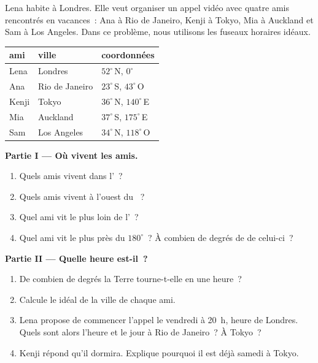 \begin{problem}
\label{pb:g6:latitude-longitude:1}
Lena habite à Londres. Elle veut organiser un appel vidéo avec quatre amis
rencontrés en vacances~: Ana à Rio de Janeiro, Kenji à Tokyo, Mia à
Auckland et Sam à Los Angeles. Dans ce problème, nous utilisons les fuseaux
horaires idéaux.

\begin{center}
\small
\begin{tabular}{lll}
\hline
ami & ville & coordonnées\\
\hline
Lena & Londres & $52^\circ$\,N, $0^\circ$\\
Ana & Rio de Janeiro & $23^\circ$\,S, $43^\circ$\,O\\
Kenji & Tokyo & $36^\circ$\,N, $140^\circ$\,E\\
Mia & Auckland & $37^\circ$\,S, $175^\circ$\,E\\
Sam & Los Angeles & $34^\circ$\,N, $118^\circ$\,O\\
\hline
\end{tabular}
\end{center}

\medskip
\noindent\textbf{Partie I --- Où vivent les amis.}
\begin{enumerate}
  \item Quels amis vivent dans l'~?
  \item Quels amis vivent à l'ouest du ~?
  \item Quel ami vit le plus loin de l'~?
  \item Quel ami vit le plus près du  $180^\circ$~? À combien de
        degrés de  de celui-ci~?
\end{enumerate}

\medskip
\noindent\textbf{Partie II --- Quelle heure est-il~?}
\begin{enumerate}[resume]
  \item De combien de degrés la Terre tourne-t-elle en une heure~?
  \item Calcule le  idéal de la ville de chaque ami.
  \item Lena propose de commencer l'appel le vendredi à 20~h, heure de
        Londres. Quels sont alors l'heure et le jour à Rio de Janeiro~? À
        Tokyo~?
  \item Kenji répond qu'il dormira. Explique pourquoi il est déjà samedi à
        Tokyo.
\end{enumerate}


\end{problem}
